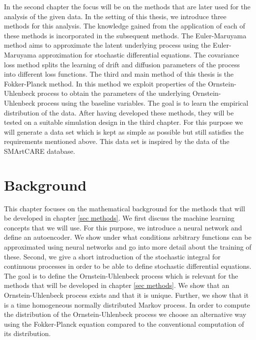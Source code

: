 \documentclass[11pt,titlepage]{article}
\theoremstyle{definition}
\theoremstyle{remark}
\begin{document}
	In the second chapter the focus will be on the methods that are later used for the analysis of the given data. In the setting of this thesis, we introduce three methods for this analysis. The knowledge gained from the application of each of these methods is incorporated in the subsequent methods. The Euler-Maruyama method aims to approximate the latent underlying process using the Euler-Maruyama approximation  for stochastic differential equations. The covariance loss method splits the learning of drift and diffusion parameters of the process into different loss functions. The third and main method of this thesis is the Fokker-Planck method. In this method we exploit properties of the Ornstein-Uhlenbeck process to obtain the parameters of the underlying Ornstein-Uhlenbeck process using the baseline variables. 
	The goal is to learn the empirical distribution of the data. 
	After having developed these methods, they will be tested on a suitable simulation design in the third chapter. For this purpose we will generate a data set which is kept as simple as possible but still satisfies the requirements mentioned above. This data set is inspired by the data of the SMArtCARE database.
	
	\newpage
	
	\section{Background} \label{sec_Background}
	
	This chapter focuses on the mathematical background for the methods that will be developed in chapter \ref{sec methods}. We first discuss the machine learning concepts that we will use. For this purpose, we introduce a neural network and define an autoencoder. We show under what conditions arbitrary functions can be approximated using neural networks and go into more detail about the training of these. Second, we give a short introduction of the stochastic integral for continuous processes in order to be able to define stochastic differential equations. The goal is to define the Ornstein-Uhlenbeck process which is relevant for the methods that will be developed in chapter \ref{sec methods}. We show that an Ornstein-Uhlenbeck process exists and that it is unique. Further, we show that it is a time homogeneous normally distributed Markov process. In order to compute the distribution of the Ornstein-Uhlenbeck process we choose an alternative way using the Fokker-Planck equation compared to the conventional computation of its distribution.
	
\end{document}
